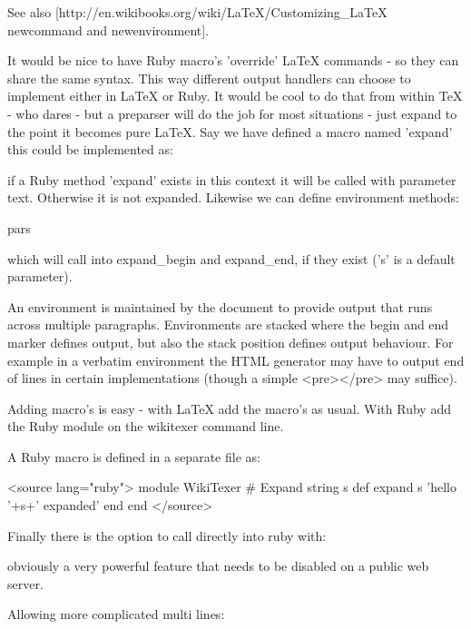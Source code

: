 See also [http://en.wikibooks.org/wiki/LaTeX/Customizing_LaTeX newcommand and newenvironment].

It would be nice to have Ruby macro's 'override' LaTeX commands - so
they can share the same syntax. This way different output handlers can
choose to implement either in LaTeX or Ruby. It would be cool to do
that from within TeX - who dares - but a preparser will do the job for
most situations - just expand to the point it becomes pure LaTeX. Say
we have defined a macro named 'expand' this could be implemented as:


if a Ruby method 'expand' exists in this context it will be called
with parameter text. Otherwise it is not expanded. Likewise we can 
define environment methods:

  \begin{expand}[s]{pars}
	\end{expand}

which will call into expand_begin and expand_end, if they exist ('s'
is a default parameter).

An environment is maintained by the document to provide output that
runs across multiple paragraphs. Environments are stacked where the
begin and end marker defines output, but also the stack position
defines output behaviour. For example in a verbatim environment the
HTML generator may have to output end of lines in certain
implementations (though a simple <pre></pre> may suffice).

Adding macro's is easy - with LaTeX add the macro's as usual. With
Ruby add the Ruby module on the wikitexer command line.

A Ruby macro is defined in a separate file as:

<source lang="ruby">
  module WikiTexer
		# Expand string s
		def expand s
			'hello '+s+' expanded'
		end
	end
</source>

Finally there is the option to call directly into ruby with:


obviously a very powerful feature that needs to be disabled on a public web server.

Allowing more complicated multi lines:



